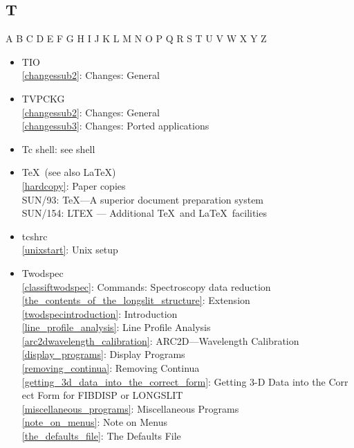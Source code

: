 \documentclass[11pt,twoside]{article}
\newcommand{\htmlref}[2]{#1}
\newcommand{\xref}[3]{#1}
\newcommand{\idxint}[2]{\ref{#1}: \htmlref{#2}{#1}}
\newcommand{\idxint}[2]{\htmlref{#2}{#1}}
\newcommand{\latorhtm}[2]{#1}
\newcommand{\latorhtm}[2]{#2}
\begin{document}
\subsection*{\label{index_T}T}

\begin{htmlonly}
\htmlref{A}{index_A}
\htmlref{B}{index_B}
\htmlref{C}{index_C}
\htmlref{D}{index_D}
\htmlref{E}{index_E}
\htmlref{F}{index_F}
\htmlref{G}{index_G}
\htmlref{H}{index_H}
\htmlref{I}{index_I}
\htmlref{J}{index_J}
\htmlref{K}{index_K}
\htmlref{L}{index_L}
\htmlref{M}{index_M}
\htmlref{N}{index_N}
\htmlref{O}{index_O}
\htmlref{P}{index_P}
\htmlref{Q}{index_Q}
\htmlref{R}{index_R}
\htmlref{S}{index_S}
T
\htmlref{U}{index_U}
\htmlref{V}{index_V}
\htmlref{W}{index_W}
\htmlref{X}{index_X}
\htmlref{Y}{index_Y}
Z
\end{htmlonly}

\begin{itemize}
\item TIO\\
   \idxint{changessub2}{Changes: General}
\item TVPCKG\\
   \idxint{changessub2}{Changes: General}\\
   \idxint{changessub3}{Changes: Ported applications}
\item Tc shell: see shell
\item \TeX\ (see also \LaTeX)\\
   \idxint{hardcopy}{Paper copies}\\
   \xref{SUN/93: \TeX\latorhtm{---}{-}A superior document preparation system}{sun93}{}\\
   \xref{SUN/154: LTEX \latorhtm{---}{-} Additional \TeX\ and \LaTeX\ facilities}{sun154}{}
\item tcshrc\\
   \idxint{unixstart}{Unix setup}
\item Twodspec\\
   \idxint{classiftwodspec}{Commands: Spectroscopy data reduction}\\
   \idxint{the_contents_of_the_longslit_structure}{Extension}\\
   \idxint{twodspecintroduction}{Introduction}\\
   \idxint{line_profile_analysis}{Line Profile Analysis}\\
   \idxint{arc2dwavelength_calibration}{ARC2D---Wavelength Calibration}\\
   \idxint{display_programs}{Display Programs}\\
   \idxint{removing_continua}{Removing Continua}\\
   \idxint{getting_3d_data_into_the_correct_form}{Getting 3-D Data into the Corr
ect Form for FIBDISP or LONGSLIT}\\
   \idxint{miscellaneous_programs}{Miscellaneous Programs}\\
   \idxint{note_on_menus}{Note on Menus}\\
   \idxint{the_defaults_file}{The Defaults File}
\end{itemize}
\end{document}
